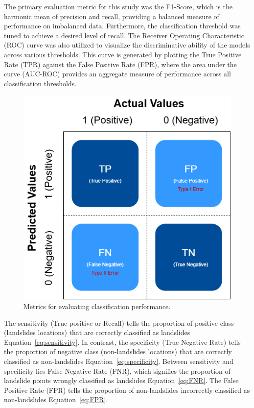 The primary evaluation metric for this study was the F1-Score, which is the harmonic mean of precision and recall, providing a balanced measure of performance on imbalanced data. Furthermore, the classification threshold was tuned to achieve a desired level of recall. The Receiver Operating Characteristic (ROC) curve was also utilized to visualize the discriminative ability of the models across various thresholds. This curve is generated by plotting the True Positive Rate (TPR) against the False Positive Rate (FPR), where the area under the curve (AUC-ROC) provides an aggregate measure of performance across all classification thresholds.
\begin{figure}[H]
    \centerline{\includegraphics[width=\linewidth]{fig5.png}}
    \caption{Metrics for evaluating classification performance.}
    \label{fig}
\end{figure}

The sensitivity (True positive or Recall) tells the proportion of positive class (landslides locations) that are correctly classified as landslides Equation~\ref{eq:sensitivity}. In contrast, the specificity (True Negative Rate) tells the proportion of negative class (non-landslides locations) that are correctly classified as non-landslides Equation~\ref{eq:specificity}. Between sensitivity and specificity lies False Negative Rate (FNR), which signifies the proportion of landslide points wrongly classified as landslides Equation~\ref{eq:FNR}. The False Positive Rate (FPR) tells the proportion of non-landslides incorrectly classified as non-landslides Equation~\ref{eq:FPR}.

